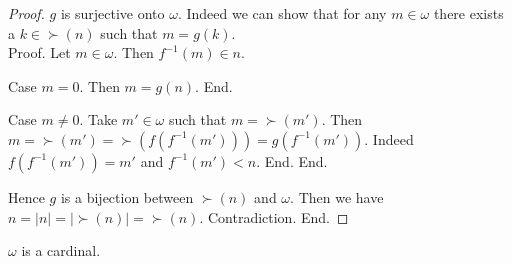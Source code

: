 \documentclass[10pt]{article}
\begin{document}
\begin{forthel}
\begin{proof}
        $g$ is surjective onto $\omega$.
        Indeed we can show that for any $m \in \omega$ there exists a $k \in \succ(n)$ such that $m = g(k)$. \\
        Proof.
          Let $m \in \omega$.
          Then $f^{-1}(m) \in n$.

          Case $m = 0$.
            Then $m = g(n)$.
          End.

          Case $m \neq 0$.
            Take $m' \in \omega$ such that $m = \succ(m')$.
            Then $m
              = \succ(m')
              = \succ(f(f^{-1}(m')))
              = g(f^{-1}(m'))$.
            Indeed $f(f^{-1}(m')) = m'$ and $f^{-1}(m') < n$.
          End.
        End.

        Hence $g$ is a bijection between $\succ(n)$ and $\omega$.
        Then we have $n
          = |n|
          = |\succ(n)|
          = \succ(n)$.
        Contradiction.
      End.
    \end{proof}
  \end{forthel}

  \begin{forthel}
    \begin{corollary}
      $\omega$ is a cardinal.
    \end{corollary}
  \end{forthel}
\end{document}
